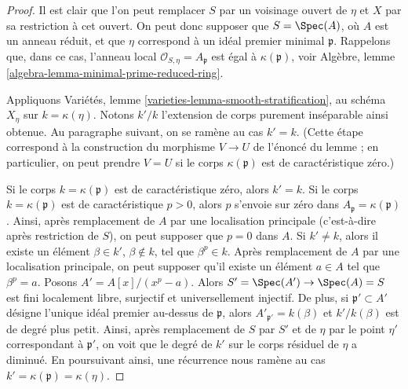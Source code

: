 \begin{proof}
Il est clair que l'on peut remplacer $S$ par un voisinage ouvert de $\eta$
et $X$ par sa restriction à cet ouvert.
On peut donc supposer que $S = \Spec(A)$, où $A$ est un anneau réduit,
et que $\eta$ correspond à un idéal premier minimal $\mathfrak p$.
Rappelons que, dans ce cas, l'anneau local $\mathcal{O}_{S, \eta} = A_\mathfrak p$
est égal à $\kappa(\mathfrak p)$, voir
Algèbre, lemme \ref{algebra-lemma-minimal-prime-reduced-ring}.

\medskip\noindent
Appliquons Variétés, lemme \ref{varieties-lemma-smooth-stratification},
au schéma $X_\eta$ sur $k = \kappa(\eta)$.
Notons $k'/k$ l'extension de corps purement inséparable ainsi obtenue.
Au paragraphe suivant, on se ramène au cas $k' = k$.
(Cette étape correspond à la construction du morphisme $V \to U$ de
l'énoncé du lemme ; en particulier, on peut prendre $V = U$
si le corps $\kappa(\mathfrak p)$ est de caractéristique zéro.)

\medskip\noindent
Si le corps $k = \kappa(\mathfrak p)$ est de caractéristique zéro, alors
$k' = k$. Si le corps $k = \kappa(\mathfrak p)$
est de caractéristique $p > 0$, alors $p$ s'envoie sur zéro dans $A_\mathfrak p = \kappa(\mathfrak p)$.
Ainsi, après remplacement de $A$ par une localisation principale (c'est-à-dire après
restriction de $S$), on peut supposer que $p = 0$ dans $A$. Si $k' \not = k$, alors
il existe un élément $\beta \in k'$, $\beta \not \in k$,
tel que $\beta^p \in k$. Après remplacement de $A$ par une localisation
principale, on peut supposer qu'il existe un élément $a \in A$ tel
que $\beta^p = a$. Posons $A' = A[x]/(x^p - a)$.
Alors $S' = \Spec(A') \to \Spec(A) = S$ est fini localement libre,
surjectif et universellement injectif. De plus, si $\mathfrak p' \subset A'$
désigne l'unique idéal premier au-dessus de $\mathfrak p$,
alors $A'_{\mathfrak p'} = k(\beta)$ et $k'/k(\beta)$
est de degré plus petit. Ainsi, après remplacement de $S$ par $S'$
et de $\eta$ par le point $\eta'$ correspondant à $\mathfrak p'$,
on voit que le degré de $k'$ sur le corps résiduel de $\eta$
a diminué. En poursuivant ainsi, une récurrence nous ramène
au cas $k' = \kappa(\mathfrak p) = \kappa(\eta)$.


\end{proof}
